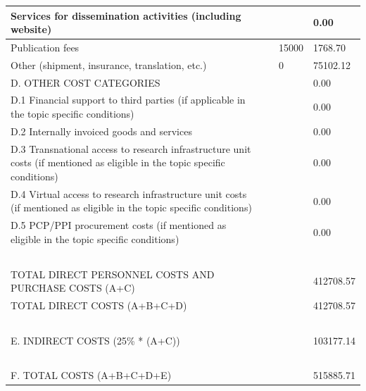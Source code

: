 \begin{table}[H]
\begin{tabular}{|l|l|l|l|}
Services for dissemination activities (including website) & ~ & ~ & 0.00 \\ \hline
Publication fees & ~ & 15000 & 1768.70 \\ \hline
Other (shipment, insurance, translation, etc.) & ~ & 0 & 75102.12 \\ \hline
D. OTHER COST CATEGORIES & ~ & ~ & 0.00\\ \hline
D.1 Financial support to third parties (if applicable in the topic specific conditions) & ~ & ~ & 0.00 \\ \hline
D.2 Internally invoiced goods and services & ~ & ~ & 0.00 \\ \hline
D.3 Transnational access to research infrastructure unit costs (if mentioned as eligible in the topic specific conditions) & ~ & ~ & 0.00 \\ \hline
D.4 Virtual access to research infrastructure unit costs (if mentioned as eligible in the topic specific conditions) & ~ & ~ & 0.00 \\ \hline
D.5 PCP/PPI procurement costs (if mentioned as eligible in the topic specific conditions) & ~ & ~ & 0.00 \\ \hline
~ & ~ & ~ & ~ \\ \hline
TOTAL DIRECT PERSONNEL COSTS AND PURCHASE COSTS (A+C) & ~ & ~ & 412708.57 \\ \hline
TOTAL DIRECT COSTS (A+B+C+D) & ~ & ~ & 412708.57 \\ \hline
~ & ~ & ~ & ~ \\ \hline
E. INDIRECT COSTS (25\% * (A+C)) & ~ & ~ & 103177.14 \\ \hline
~ & ~ & ~ & ~ \\ \hline
F. TOTAL COSTS (A+B+C+D+E) & ~ & ~ & 515885.71 \\ \hline
\end{tabular}
\end{table}

